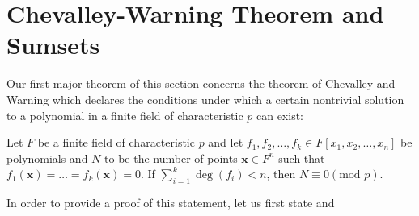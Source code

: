 \section{Chevalley-Warning Theorem and Sumsets}  Our first
major theorem of this section concerns the theorem of Chevalley and Warning
which declares the conditions under which a certain nontrivial solution to a
polynomial in a finite field of characteristic $p$ can exist:
\begin{theorem} Let $F$ be a finite field of
	characteristic $p$ and let $f_1, f_2, \ldots, f_k \in F[x_1, x_2,
	\ldots, x_{n}]$ be polynomials and $N$ to be the number of points
	$\textbf{x}\in F^{n}$ such that $f_1\left( \textbf{x} \right) = \ldots
	= f_k \left( \textbf{x} \right)  = 0$. If $ \sum_{i= 1}^{k} \deg \left(
	f_{i} \right)< n$, then $N \equiv 0 (\text{mod } p) $.  \end{theorem}
	In order to provide a proof of this statement, let us first state and
